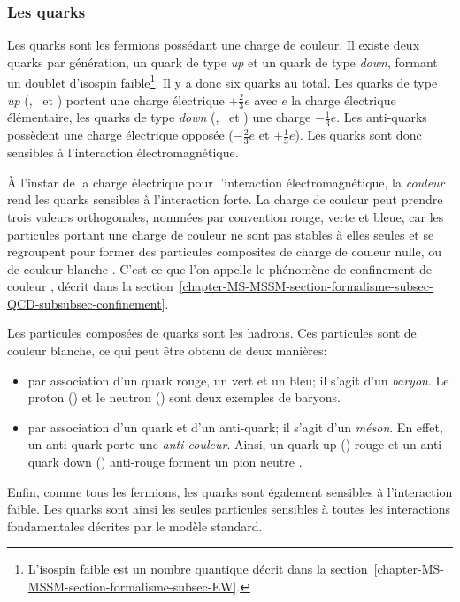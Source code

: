 \subsubsection{Les quarks}\label{chapter-MS-MSSM-section-SM_ptcs-subsec-fermions-subsubsec-quarks}
Les quarks sont les fermions possédant une charge de couleur.
Il existe deux quarks par génération, un quark de type \emph{up} et un quark de type \emph{down}, formant un doublet d'isospin faible\footnote{L'isospin faible est un nombre quantique décrit dans la section~\ref{chapter-MS-MSSM-section-formalisme-subsec-EW}.}. Il y a donc six quarks au total. Les quarks de type \emph{up} (\quarku, \quarkc\ et \quarkt) portent une charge électrique $+\frac{2}{3}e$ avec $e$ la charge électrique élémentaire, les quarks de type \emph{down} (\quarkd, \quarks\ et \quarkb) une charge $-\frac{1}{3}e$. Les anti-quarks possèdent une charge électrique opposée ($-\frac{2}{3}e$ et $+\frac{1}{3}e$). Les quarks sont donc sensibles à l'interaction électromagnétique.
\par À l'instar de la charge électrique pour l'interaction électromagnétique, la \emph{couleur} rend les quarks sensibles à l'interaction forte. La charge de couleur peut prendre trois valeurs orthogonales, nommées par convention rouge, verte et bleue, car les particules portant une charge de couleur ne sont pas stables à elles seules et se regroupent pour former des particules composites de charge de couleur nulle, ou de couleur \og blanche \fg{}. C'est ce que l'on appelle le phénomène de \og confinement de couleur \fg, décrit dans la section~\ref{chapter-MS-MSSM-section-formalisme-subsec-QCD-subsubsec-confinement}.
\par Les particules composées de quarks sont les hadrons. Ces particules sont de couleur blanche, ce qui peut être obtenu de deux manières:
\begin{itemize}
\item par association d'un quark rouge, un vert et un bleu; il s'agit d'un \emph{baryon}. Le proton (\quarku\quarku\quarkd) et le neutron (\quarku\quarkd\quarkd) sont deux exemples de baryons.
\item par association d'un quark et d'un anti-quark; il s'agit d'un \emph{méson}. En effet, un anti-quark porte une \emph{anti-couleur}. Ainsi, un quark up (\quarku) rouge et un anti-quark down (\antiquarkd) \og anti-rouge \fg{} forment un pion neutre \pionnull.
\end{itemize}
\par Enfin, comme tous les fermions, les quarks sont également sensibles à l'interaction faible. Les quarks sont ainsi les seules particules sensibles à toutes les interactions fondamentales décrites par le modèle standard.

